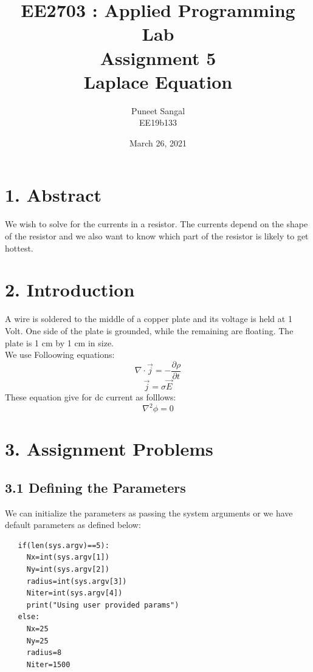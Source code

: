 \documentclass[12pt, a4paper]{report}
\title{\textbf{EE2703 : Applied Programming Lab \\ Assignment 5 \\Laplace Equation}} %
\author{Puneet Sangal\\ EE19b133} %
\date{March 26, 2021} %
\begin{document}
		
		
\maketitle %
\section*{1. Abstract}
We wish to solve for the currents in a resistor. The currents depend on the shape of the resistor and we also want to know which part of the resistor is likely to get hottest.

\section*{2. Introduction}
A wire is soldered to the middle of a copper plate and its voltage is held at 1 Volt. One side of the plate is
grounded, while the remaining are floating. The plate is 1 cm by 1 cm in size.
\\
We use Folloowing equations:
\begin{equation}
    \nabla \cdot \vec{j} = - \frac{\partial\rho}{\partial t}
\end{equation}
\begin{equation}
     \vec{j} = \sigma\vec{E}
\end{equation}
These equation give for dc current as folllows:
\begin{equation}
   \nabla^2 \phi =  0
\end{equation}

\section*{3. Assignment Problems}
 
 \subsection*{3.1 Defining the Parameters}
  We can initialize the parameters as passing the system arguments or we have default parameters as defined below:
  
  \begin{verbatim}
   if(len(sys.argv)==5):
     Nx=int(sys.argv[1])
     Ny=int(sys.argv[2])
     radius=int(sys.argv[3])
     Niter=int(sys.argv[4])
     print("Using user provided params")
   else:
     Nx=25                                            
     Ny=25                                           
     radius=8                                         
     Niter=1500                                      
  \end{verbatim}
  
\end{document}
